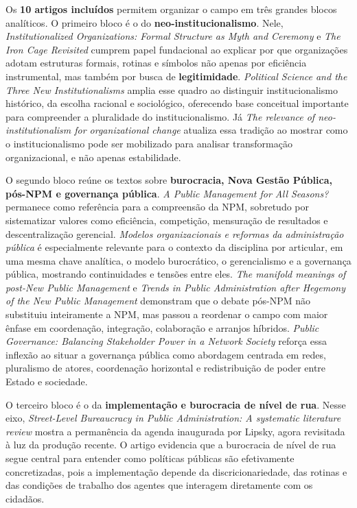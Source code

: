 \documentclass[12pt]{article}
\begin{document}
Os \textbf{10 artigos incluídos} permitem organizar o campo em três grandes blocos analíticos. O primeiro bloco é o do \textbf{neo-institucionalismo}. Nele, \emph{Institutionalized Organizations: Formal Structure as Myth and Ceremony} e \emph{The Iron Cage Revisited} cumprem papel fundacional ao explicar por que organizações adotam estruturas formais, rotinas e símbolos não apenas por eficiência instrumental, mas também por busca de \textbf{legitimidade}. \emph{Political Science and the Three New Institutionalisms} amplia esse quadro ao distinguir institucionalismo histórico, da escolha racional e sociológico, oferecendo base conceitual importante para compreender a pluralidade do institucionalismo. Já \emph{The relevance of neo-institutionalism for organizational change} atualiza essa tradição ao mostrar como o institucionalismo pode ser mobilizado para analisar transformação organizacional, e não apenas estabilidade.

O segundo bloco reúne os textos sobre \textbf{burocracia, Nova Gestão Pública, pós-NPM e governança pública}. \emph{A Public Management for All Seasons?} permanece como referência para a compreensão da NPM, sobretudo por sistematizar valores como eficiência, competição, mensuração de resultados e descentralização gerencial. \emph{Modelos organizacionais e reformas da administração pública} é especialmente relevante para o contexto da disciplina por articular, em uma mesma chave analítica, o modelo burocrático, o gerencialismo e a governança pública, mostrando continuidades e tensões entre eles. \emph{The manifold meanings of post-New Public Management} e \emph{Trends in Public Administration after Hegemony of the New Public Management} demonstram que o debate pós-NPM não substituiu inteiramente a NPM, mas passou a reordenar o campo com maior ênfase em coordenação, integração, colaboração e arranjos híbridos. \emph{Public Governance: Balancing Stakeholder Power in a Network Society} reforça essa inflexão ao situar a governança pública como abordagem centrada em redes, pluralismo de atores, coordenação horizontal e redistribuição de poder entre Estado e sociedade.

O terceiro bloco é o da \textbf{implementação e burocracia de nível de rua}. Nesse eixo, \emph{Street-Level Bureaucracy in Public Administration: A systematic literature review} mostra a permanência da agenda inaugurada por Lipsky, agora revisitada à luz da produção recente. O artigo evidencia que a burocracia de nível de rua segue central para entender como políticas públicas são efetivamente concretizadas, pois a implementação depende da discricionariedade, das rotinas e das condições de trabalho dos agentes que interagem diretamente com os cidadãos.
\end{document}
